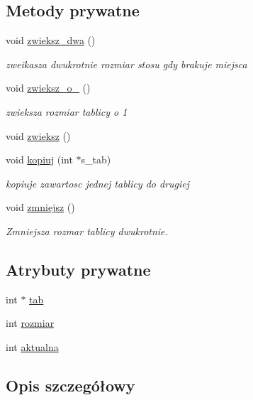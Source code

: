 \subsection*{\-Metody prywatne}
\begin{DoxyCompactItemize}
\item 
void \hyperlink{classstos_aaf0cbb2759166f5c8ade9db7edd12e71}{zwieksz\-\_\-dwa} ()
\begin{DoxyCompactList}\small\item\em zweikasza dwukrotnie rozmiar stosu gdy brakuje miejsca \end{DoxyCompactList}\item 
void \hyperlink{classstos_a46a2e2a17327297ca70b40ff39524cef}{zwieksz\-\_\-o\-\_} ()
\begin{DoxyCompactList}\small\item\em zwieksza rozmiar tablicy o 1 \end{DoxyCompactList}\item 
void \hyperlink{classstos_a7eaf47bc9feeea0777e07f89d0d304cf}{zwieksz} ()
\item 
void \hyperlink{classstos_ae5ace69c31d9de2f24eb872895216bf3}{kopiuj} (int $\ast$s\-\_\-tab)
\begin{DoxyCompactList}\small\item\em kopiuje zawartosc jednej tablicy do drugiej \end{DoxyCompactList}\item 
void \hyperlink{classstos_aeabdfcdd334943a4a22a6f095bd7a873}{zmniejsz} ()
\begin{DoxyCompactList}\small\item\em \-Zmniejsza rozmar tablicy dwukrotnie. \end{DoxyCompactList}\end{DoxyCompactItemize}
\subsection*{\-Atrybuty prywatne}
\begin{DoxyCompactItemize}
\item 
int $\ast$ \hyperlink{classstos_a71155717d44c2156515be8edb1139358}{tab}
\item 
int \hyperlink{classstos_aaccd7c15d97e23313862cca67f56f3ab}{rozmiar}
\item 
int \hyperlink{classstos_a5769bde313093eb321b0b15111c7ec35}{aktualna}
\end{DoxyCompactItemize}


\subsection{\-Opis szczegółowy}


